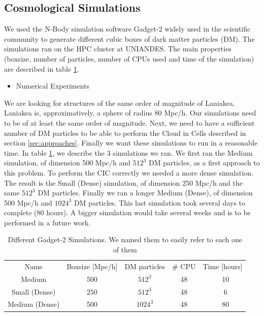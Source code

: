 \documentclass[12pt]{article}
\begin{document}
\subsection{Cosmological Simulations}\label{sec:sims}
\begin{par}
We used the N-Body simulation software Gadget-2
 \cite{springel_gadget_2_2005}
widely used in the scientific community to
 generate different cubic boxes of dark matter
  particles
  (DM). The simulations ran on the HPC cluster at
   UNIANDES.
  The main properties (boxsize, number of
   particles, number of CPUs used and time of the
    simulation) are described in table
     \ref{tab:sims}. \\
\end{par}
\begin{itemize}
\item Numerical Experiments
\end{itemize}
\begin{par}
We are looking for structures of the same order of
 magnitude of Laniakea. Laniakea is, approximatively, a
  sphere of radius 80 Mpc/h. Our simulations need to be
   of at least the same order of magnitude. Next, we
    need to have a sufficient number of DM particles to
     be able to perform the Cloud in Cells described in
      section \ref{sec:approaches}. Finally we want
       these simulations to run in a reasonable time. 
       In table \ref{tab:sims}, we describe the 3
        simulations we ran. We first ran the Medium
         simulation, of dimension 500 Mpc/h and $512^3$
          DM particles, as a first approach to this
           problem. To perform the CIC correctly we
            needed a more dense simulation. The result
             is the Small (Dense) simulation, of
              dimension 250 Mpc/h and the same $512^3$
               DM particles. Finally we ran a longer
                Medium (Dense), of dimension 500 Mpc/h
                 and  $1024^3$ DM particles. This last
                  simulation took several days to
                   complete (80 hours). A bigger
                    simulation would take several weeks
                     and is to be performed in a future
                      work.
\end{par}
\begin{table}[ht]
    \centering
    \begin{tabular}{|c|c|c|c|c|}
        Name & Boxsize [Mpc/h] & DM particles & \# CPU & Time [hours] \\
        Medium & 500 & $512^{3}$ & 48 & ~ 10 \\
        Small (Dense) & 250 & $512^{3}$ & 48 & ~ 6  \\
        Medium (Dense) & 500 & $1024^{3}$ & 48 & ~ 80\\
    \end{tabular}
    \caption{Different Gadget-2 Simulations. We named them to easily refer to each one of them}
    \label{tab:sims}
\end{table}
\FloatBarrier
\end{document}
